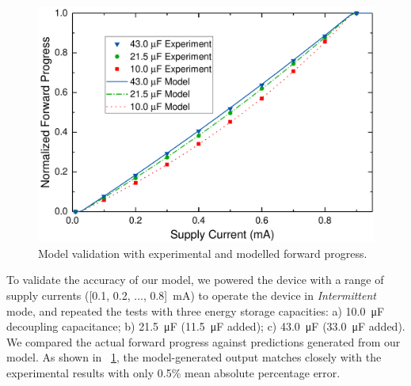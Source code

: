 

\begin{figure}
	\centering
	\includegraphics[width=0.8\columnwidth]{ch3_sizingeffect/figures/ModelValidFig} %
	\caption{Model validation with experimental and modelled forward progress. }
	\label{fig:modelvalid}
\end{figure}

To validate the accuracy of our model, we powered the device with a range of supply currents ([0.1, 0.2, ..., 0.8]\SI{}{\milli\ampere}) to operate the device in \textit{Intermittent} mode, and repeated the tests with three energy storage capacities: a) \SI{10.0}{\micro\farad} decoupling capacitance; b) \SI{21.5}{\micro\farad} (\SI{11.5}{\micro\farad} added); c) \SI{43.0}{\micro\farad} (\SI{33.0}{\micro\farad} added). We compared the actual forward progress against predictions generated from our model. As shown in \figurename{~\ref{fig:modelvalid}}, the model-generated output matches closely with the experimental results with only 0.5\% mean absolute percentage error. 


